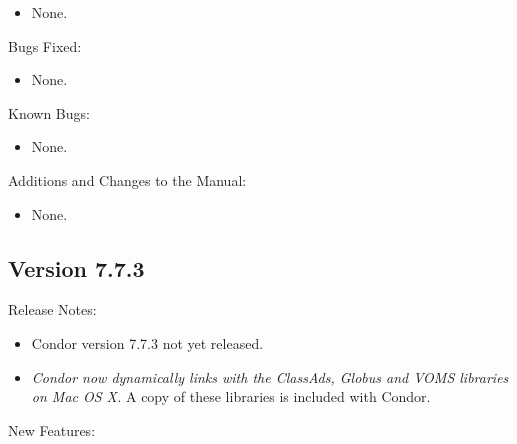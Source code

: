 \begin{itemize}

\item None.

\end{itemize}

\noindent Bugs Fixed:

\begin{itemize}

\item None.

\end{itemize}

\noindent Known Bugs:

\begin{itemize}

\item None.

\end{itemize}

\noindent Additions and Changes to the Manual:

\begin{itemize}

\item None.

\end{itemize}


\subsection*{\label{sec:New-7-7-3}Version 7.7.3}

\noindent Release Notes:

\begin{itemize}

\item Condor version 7.7.3 not yet released.

\item
\emph{Condor now dynamically links with the ClassAds, Globus and VOMS
libraries on Mac OS X.}
A copy of these libraries is included with Condor.

\end{itemize}


\noindent New Features:

